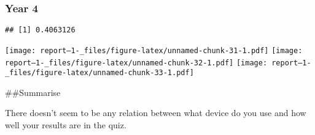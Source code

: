 \documentclass[
]{article}
\begin{document}
\hypertarget{year-4-5}{%
\subsubsection{Year 4}\label{year-4-5}}

\begin{verbatim}
## [1] 0.4063126
\end{verbatim}

\texttt{[image: report--1-\_files/figure-latex/unnamed-chunk-31-1.pdf]}
\texttt{[image: report--1-\_files/figure-latex/unnamed-chunk-32-1.pdf]}
\texttt{[image: report--1-\_files/figure-latex/unnamed-chunk-33-1.pdf]}

\#\#Summarise

There doesn't seem to be any relation between what device do you use and
how well your results are in the quiz.
\end{document}
